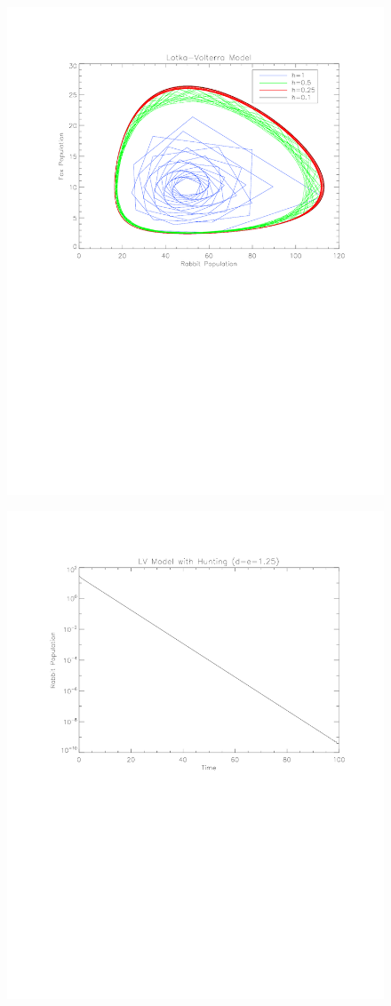 \documentclass[11pt]{article}
\begin{document}
\begin{figure}
\centering
\includegraphics{Prey.pdf}
\caption{}
\end{figure}
\begin{figure}
\centering
\includegraphics{Preyhunt.pdf}
\caption{}
\end{figure}
\end{document}
